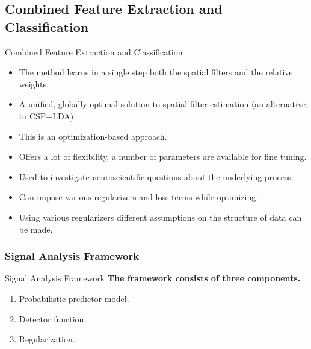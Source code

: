 \documentclass[11pt]{beamer}
\begin{document}
\subsection{Combined Feature Extraction and Classification}
\begin{frame}{Combined Feature Extraction and Classification}
 \begin{itemize}
  \item  The method learns in a single step both the spatial filters and the relative weights.
\item A unified, globally optimal solution to spatial filter estimation (an alternative to CSP+LDA).
\item This is an optimization-based approach.
      \item Offers a lot of flexibility, a number of parameters are available for fine tuning.
        \item Used to investigate neuroscientific questions about the underlying process.
\item Can impose various regularizers and loss terms while optimizing.
\item Using various regularizers different assumptions on the structure of data can be made.

     \end{itemize}
\end{frame}
\subsubsection{Signal Analysis Framework}
\begin{frame}{Signal Analysis Framework}
\textbf{The framework consists of three  components.}

 \begin{enumerate}
         [default]
  \item  Probabilistic predictor model.
    \item Detector function.
      \item Regularization.
        \end{enumerate}
\end{frame}
\end{document}
